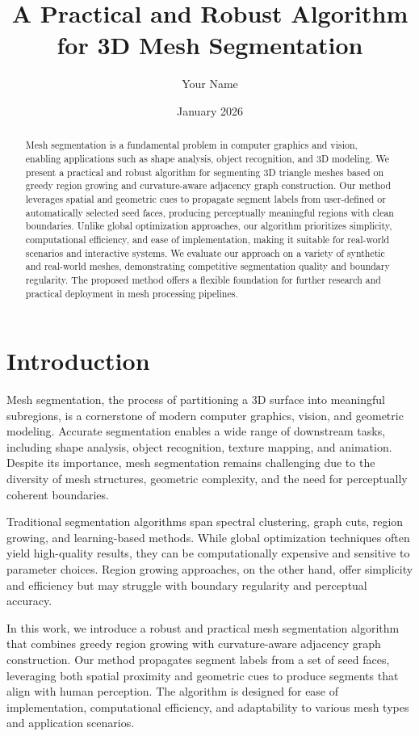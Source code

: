 \documentclass[11pt]{article}
\title{A Practical and Robust Algorithm for 3D Mesh Segmentation}
\author{Your Name}
\date{January 2026}
\begin{document}
\maketitle

\begin{abstract}
Mesh segmentation is a fundamental problem in computer graphics and vision, enabling applications such as shape analysis, object recognition, and 3D modeling. We present a practical and robust algorithm for segmenting 3D triangle meshes based on greedy region growing and curvature-aware adjacency graph construction. Our method leverages spatial and geometric cues to propagate segment labels from user-defined or automatically selected seed faces, producing perceptually meaningful regions with clean boundaries. Unlike global optimization approaches, our algorithm prioritizes simplicity, computational efficiency, and ease of implementation, making it suitable for real-world scenarios and interactive systems. We evaluate our approach on a variety of synthetic and real-world meshes, demonstrating competitive segmentation quality and boundary regularity. The proposed method offers a flexible foundation for further research and practical deployment in mesh processing pipelines.
\end{abstract}

\section{Introduction}
Mesh segmentation, the process of partitioning a 3D surface into meaningful subregions, is a cornerstone of modern computer graphics, vision, and geometric modeling. Accurate segmentation enables a wide range of downstream tasks, including shape analysis, object recognition, texture mapping, and animation. Despite its importance, mesh segmentation remains challenging due to the diversity of mesh structures, geometric complexity, and the need for perceptually coherent boundaries.

Traditional segmentation algorithms span spectral clustering, graph cuts, region growing, and learning-based methods. While global optimization techniques often yield high-quality results, they can be computationally expensive and sensitive to parameter choices. Region growing approaches, on the other hand, offer simplicity and efficiency but may struggle with boundary regularity and perceptual accuracy.

In this work, we introduce a robust and practical mesh segmentation algorithm that combines greedy region growing with curvature-aware adjacency graph construction. Our method propagates segment labels from a set of seed faces, leveraging both spatial proximity and geometric cues to produce segments that align with human perception. The algorithm is designed for ease of implementation, computational efficiency, and adaptability to various mesh types and application scenarios.
\end{document}
